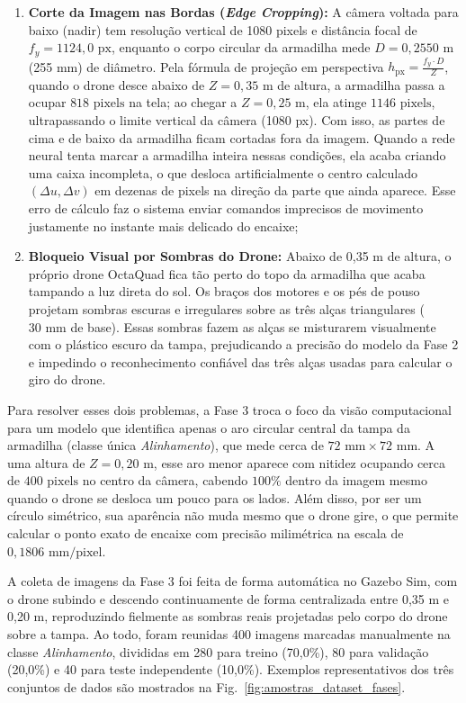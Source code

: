 \begin{enumerate}
	\item \textbf{Corte da Imagem nas Bordas (\textit{Edge Cropping}):} A câmera voltada para baixo (nadir) tem resolução vertical de 1080 pixels e distância focal de $f_y = 1124,0\text{ px}$, enquanto o corpo circular da armadilha mede $D = 0,2550\text{ m}$ (255 mm) de diâmetro. Pela fórmula de projeção em perspectiva $h_{\text{px}} = \frac{f_y \cdot D}{Z}$, quando o drone desce abaixo de $Z = 0,35\text{ m}$ de altura, a armadilha passa a ocupar $818\text{ pixels}$ na tela; ao chegar a $Z = 0,25\text{ m}$, ela atinge $1146\text{ pixels}$, ultrapassando o limite vertical da câmera (1080 px). Com isso, as partes de cima e de baixo da armadilha ficam cortadas fora da imagem. Quando a rede neural tenta marcar a armadilha inteira nessas condições, ela acaba criando uma caixa incompleta, o que desloca artificialmente o centro calculado $(\Delta u, \Delta v)$ em dezenas de pixels na direção da parte que ainda aparece. Esse erro de cálculo faz o sistema enviar comandos imprecisos de movimento justamente no instante mais delicado do encaixe;
	
	\item \textbf{Bloqueio Visual por Sombras do Drone:} Abaixo de 0,35 m de altura, o próprio drone OctaQuad fica tão perto do topo da armadilha que acaba tampando a luz direta do sol. Os braços dos motores e os pés de pouso projetam sombras escuras e irregulares sobre as três alças triangulares ($30\text{ mm}$ de base). Essas sombras fazem as alças se misturarem visualmente com o plástico escuro da tampa, prejudicando a precisão do modelo da Fase 2 e impedindo o reconhecimento confiável das três alças usadas para calcular o giro do drone.
\end{enumerate}

Para resolver esses dois problemas, a Fase 3 troca o foco da visão computacional para um modelo que identifica apenas o aro circular central da tampa da armadilha (classe única \textit{Alinhamento}), que mede cerca de $72\text{ mm} \times 72\text{ mm}$. A uma altura de $Z = 0,20\text{ m}$, esse aro menor aparece com nitidez ocupando cerca de $400\text{ pixels}$ no centro da câmera, cabendo $100\%$ dentro da imagem mesmo quando o drone se desloca um pouco para os lados. Além disso, por ser um círculo simétrico, sua aparência não muda mesmo que o drone gire, o que permite calcular o ponto exato de encaixe com precisão milimétrica na escala de $0,1806\text{ mm/pixel}$.

A coleta de imagens da Fase 3 foi feita de forma automática no Gazebo Sim, com o drone subindo e descendo continuamente de forma centralizada entre 0,35 m e 0,20 m, reproduzindo fielmente as sombras reais projetadas pelo corpo do drone sobre a tampa. Ao todo, foram reunidas 400 imagens marcadas manualmente na classe \textit{Alinhamento}, divididas em 280 para treino (70,0\%), 80 para validação (20,0\%) e 40 para teste independente (10,0\%). Exemplos representativos dos três conjuntos de dados são mostrados na Fig.~\ref{fig:amostras_dataset_fases}.

